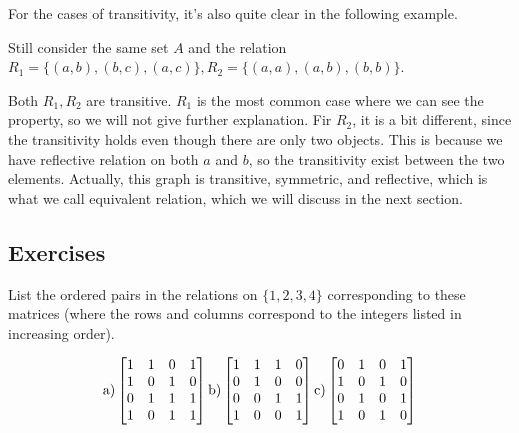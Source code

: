 	For the cases of transitivity, it's also quite clear in the following example.
	\begin{example}
		Still consider the same set $A$ and the relation $R_1 = \{(a,b), (b,c), (a,c)\}, R_2 = \{(a,a), (a,b),(b,b)\}$.
	\begin{figure}[H]
		\centering
		\hspace{2cm}
	\end{figure}
	 Both $R_1,R_2$ are transitive. $R_1$ is the most common case where we can see the property, so we will not give further explanation. Fir $R_2$, it is a bit different, since the transitivity holds even though there are only two objects. This is because we have reflective relation on both $a$ and $b$, so the transitivity exist between the two elements. Actually, this graph is transitive, symmetric, and reflective, which is what we call equivalent relation, which we will discuss in the next section.
	
	\end{example}




\subsection{Exercises}
\begin{exercise}
	List the ordered pairs in the relations on $\{1, 2, 3, 4\}$ corresponding to these matrices (where the rows and columns correspond to the integers listed in increasing order).
	
		
		$$\text{a)}
		\begin{bmatrix}
			1 & 1 & 0 & 1 \\
			1 & 0 & 1 & 0 \\
			0 & 1 & 1 & 1 \\
			1 & 0 & 1 & 1 \\
		\end{bmatrix}
		\text{b)}
		\begin{bmatrix}
			1 & 1 & 1 & 0 \\
			0 & 1 & 0 & 0 \\
			0 & 0 & 1 & 1 \\
			1 & 0 & 0 & 1 \\
		\end{bmatrix}
		\text{c)}
		\begin{bmatrix}
			0 & 1 & 0 & 1 \\
			1 & 0 & 1 & 0 \\
			0 & 1 & 0 & 1 \\
			1 & 0 & 1 & 0 \\
		\end{bmatrix}$$
		

\end{exercise}

